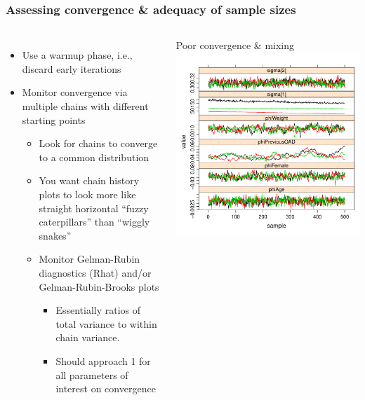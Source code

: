 \documentclass{beamer}
\begin{document}
\begin{frame}
  \frametitle{Assessing convergence \& adequacy of sample sizes}
  
\begin{columns}
\begin{itemize}
\item Use a warmup phase, i.e., discard early iterations
\item Monitor convergence via multiple chains with different starting points
\begin{itemize}
\item Look for chains to converge to a common distribution
\item You want chain history plots to look more like straight horizontal “fuzzy caterpillars” than “wiggly snakes”
\item Monitor Gelman-Rubin diagnostics (Rhat) and/or Gelman-Rubin-Brooks plots
\begin{itemize}
\item Essentially ratios of total variance to within chain variance.
\item Should approach 1 for all parameters of interest on convergence
\end{itemize}
\end{itemize}
\end{itemize}
\center
\vspace{-16pt}
Poor convergence \& mixing\\
\includegraphics[width=\textwidth,height=0.4\textheight]{graphics/poorConvergence.pdf}\\

\end{columns}
\end{frame}
\end{document}
